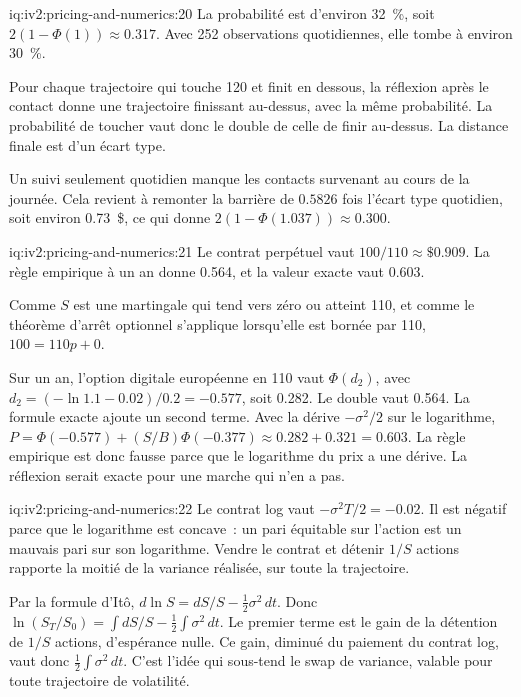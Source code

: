 \begin{solution}{iq:iv2:pricing-and-numerics:20}
La probabilité est d'environ 32~\%, soit $2(1 - \Phi(1)) \approx 0.317$. Avec 252 observations quotidiennes, elle tombe à environ 30~\%.

Pour chaque trajectoire qui touche 120 et finit en dessous, la réflexion après le contact donne une trajectoire finissant au-dessus, avec la même probabilité. La probabilité de toucher vaut donc le double de celle de finir au-dessus. La distance finale est d'un écart type.

Un suivi seulement quotidien manque les contacts survenant au cours de la journée. Cela revient à remonter la barrière de $0.5826$ fois l'écart type quotidien, soit environ 0.73~\$, ce qui donne $2(1 - \Phi(1.037)) \approx 0.300$.

\end{solution}

\begin{solution}{iq:iv2:pricing-and-numerics:21}
Le contrat perpétuel vaut $100/110 \approx \$0.909$. La règle empirique à un an donne 0.564, et la valeur exacte vaut 0.603.

Comme $S$ est une martingale qui tend vers zéro ou atteint 110, et comme le théorème d'arrêt optionnel s'applique lorsqu'elle est bornée par 110, $100 = 110p + 0$.

Sur un an, l'option digitale européenne en 110 vaut $\Phi(d_2)$, avec $d_2 = (-\ln 1.1 - 0.02)/0.2 = -0.577$, soit 0.282. Le double vaut 0.564. La formule exacte ajoute un second terme. Avec la dérive $-\sigma^2/2$ sur le logarithme, $P = \Phi(-0.577) + (S/B)\Phi(-0.377) \approx 0.282 + 0.321 = 0.603$. La règle empirique est donc fausse parce que le logarithme du prix a une dérive. La réflexion serait exacte pour une marche qui n'en a pas.

\end{solution}

\begin{solution}{iq:iv2:pricing-and-numerics:22}
Le contrat log vaut $-\sigma^2T/2 = -0.02$. Il est négatif parce que le logarithme est concave~: un pari équitable sur l'action est un mauvais pari sur son logarithme. Vendre le contrat et détenir $1/S$ actions rapporte la moitié de la variance réalisée, sur toute la trajectoire.

Par la formule d'Itô, $d\ln S = dS/S - \tfrac12\sigma^2\,dt$. Donc $\ln(S_T/S_0) = \int dS/S - \tfrac12\int\sigma^2\,dt$. Le premier terme est le gain de la détention de $1/S$ actions, d'espérance nulle. Ce gain, diminué du paiement du contrat log, vaut donc $\tfrac12\int\sigma^2\,dt$. C'est l'idée qui sous-tend le swap de variance, valable pour toute trajectoire de volatilité.

\end{solution}

